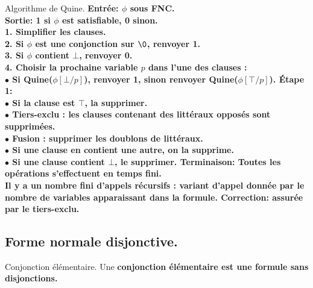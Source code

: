 \documentclass[french, 11pt]{article}
\begin{document}
\begin{defi}{Algorithme de Quine.}{}
    \bf{Entrée:} $\phi$ sous FNC.\\
    \bf{Sortie:} 1 si $\phi$ est satisfiable, 0 sinon.\\
    1. Simplifier les clauses.\\
    2. Si $\phi$ est une conjonction sur $\0$, renvoyer 1.\\
    3. Si $\phi$ contient $\bot$, renvoyer 0.\\
    4. Choisir la prochaine variable $p$ dans l'une des clauses :\\
    \hspace*{2em}$\bullet$ Si Quine($\phi[\bot/p]$), renvoyer 1, sinon renvoyer Quine($\phi[\top/p]$).\n
    \bf{Étape 1:}\\
    \hspace*{1em}$\bullet$ Si la clause est $\top$, la supprimer.\\
    \hspace*{1em}$\bullet$ Tiers-exclu : les clauses contenant des littéraux opposés sont supprimées.\\
    \hspace*{1em}$\bullet$ Fusion : supprimer les doublons de littéraux.\\
    \hspace*{1em}$\bullet$ Si une clause en contient une autre, on la supprime.\\
    \hspace*{1em}$\bullet$ Si une clause contient $\bot$, le supprimer.\n
    \bf{Terminaison:} Toutes les opérations s'effectuent en temps fini.\\
    Il y a un nombre fini d'appels récursifs  : variant d'appel donnée par le nombre de variables apparaissant dans la formule.\n
    \bf{Correction:} assurée par le tiers-exclu.
\end{defi}

\subsection{Forme normale disjonctive.}

\begin{defi}{Conjonction élémentaire.}{}
    Une \bf{conjonction élémentaire} est une formule sans disjonctions.
\end{defi}
\end{document}
